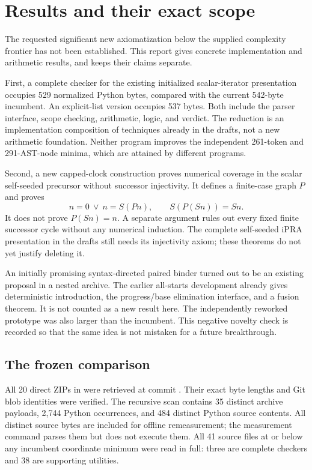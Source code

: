 \section{Results and their exact scope}
\label{sec:results}

The requested significant new axiomatization below the supplied complexity
frontier has not been established. This report gives concrete implementation
and arithmetic results, and keeps their claims separate.

First, a complete checker for the existing initialized scalar-iterator
presentation occupies 529 normalized Python bytes, compared with the current
542-byte incumbent. An explicit-list version occupies 537 bytes. Both include
the parser interface, scope checking, arithmetic, logic, and verdict. The
reduction is an implementation composition of techniques already in the
drafts, not a new arithmetic foundation. Neither program improves the independent
261-token and 291-AST-node minima, which are attained by different programs.

Second, a new capped-clock construction proves numerical coverage in the
scalar self-seeded precursor without successor injectivity. It defines a
finite-case graph $P$ and proves
\[
 n=0\ \lor\ n=S(Pn),\qquad S(P(Sn))=Sn.
\]
It does not prove $P(Sn)=n$. A separate argument rules out every fixed finite
successor cycle without any numerical induction. The complete self-seeded
iPRA presentation in the drafts still needs its injectivity axiom; these
theorems do not yet justify deleting it.

An initially promising syntax-directed paired binder turned out to be an
existing proposal in a nested archive. The earlier all-starts development
already gives deterministic introduction, the progress/base elimination
interface, and a fusion theorem. It is not counted as a new result here.
The independently reworked prototype was also larger than the incumbent.
This negative novelty check is recorded so that the same idea is not
mistaken for a future breakthrough.\cite{allstarts}

\subsection{The frozen comparison}

All 20 direct ZIPs in  were retrieved at commit
. Their exact byte lengths
and Git blob identities were verified. The recursive scan contains 35 distinct
archive payloads, 2,744 Python occurrences, and 484 distinct Python source
contents. All distinct source bytes are included for offline remeasurement;
the measurement command parses them but does not execute them. All 41
source files at or below any incumbent coordinate minimum were read in full:
three are complete checkers and 38 are supporting utilities.


